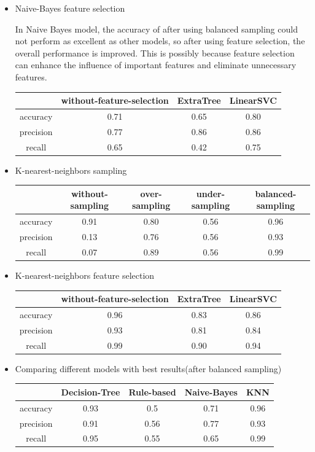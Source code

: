 \documentclass{article}
\begin{document}
\begin{itemize}
\item Naive-Bayes feature selection

In Naive Bayes model, the accuracy of after using balanced sampling could not perform as excellent as other models, so after using feature selection, the overall performance is improved. This is possibly because feature selection can enhance the influence of important features and eliminate unnecessary features.

\begin{tabular}{c|c|c|c}
\hline
 &without-feature-selection &ExtraTree &LinearSVC\\
\hline
accuracy &0.71 &0.65 &0.80\\
\hline
precision &0.77 &0.86 &0.86\\
\hline
recall &0.65 &0.42 &0.75\\
\hline
\end{tabular}

\item K-nearest-neighbors sampling

\begin{tabular}{c|c|c|c|c}
\hline
 &without-sampling &over-sampling &under-sampling &balanced-sampling\\
\hline
accuracy &0.91 &0.80 &0.56 &0.96\\
\hline
precision &0.13 &0.76 &0.56 &0.93\\
\hline
recall &0.07 &0.89 &0.56 &0.99\\
\hline
\end{tabular}

\item K-nearest-neighbors feature selection

\begin{tabular}{c|c|c|c}
\hline
 &without-feature-selection &ExtraTree &LinearSVC\\
\hline
accuracy &0.96 &0.83 &0.86\\
\hline
precision &0.93 &0.81 &0.84\\
\hline
recall &0.99 &0.90 &0.94\\
\hline
\end{tabular}

\item Comparing different models with best results(after balanced sampling)

\begin{tabular}{c|c|c|c|c}
\hline
 &Decision-Tree &Rule-based &Naive-Bayes &KNN\\
\hline
accuracy &0.93 &0.5 &0.71 &0.96\\
\hline
precision &0.91 &0.56 &0.77 &0.93\\
\hline
recall &0.95 &0.55 &0.65 &0.99\\
\hline
\end{tabular}



\end{itemize}
\end{document}
